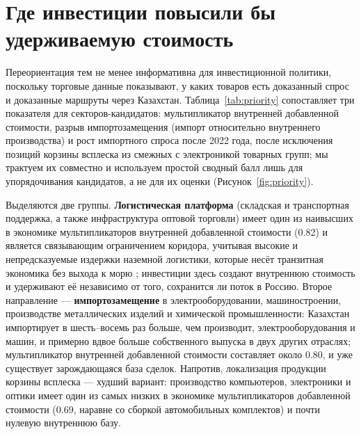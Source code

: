 \documentclass[12pt]{article}
\begin{document}
\section{Где инвестиции повысили бы удерживаемую стоимость}\label{sec:where}

Переориентация тем не менее информативна для инвестиционной политики, поскольку торговые
данные показывают, у каких товаров есть доказанный спрос и доказанные маршруты через
Казахстан. Таблица~\ref{tab:priority} сопоставляет три показателя для секторов-кандидатов:
мультипликатор внутренней добавленной стоимости, разрыв импортозамещения (импорт
относительно внутреннего производства) и рост импортного спроса после 2022 года, после
исключения позиций корзины всплеска из смежных с электроникой товарных групп; мы трактуем
их совместно и используем простой сводный балл лишь для упорядочивания кандидатов, а не для
их оценки (Рисунок~\ref{fig:priority}).

Выделяются две группы. \textbf{Логистическая платформа} (складская и транспортная
поддержка, а также инфраструктура оптовой торговли) имеет один из наивысших в экономике
мультипликаторов внутренней добавленной стоимости (0.82) и является связывающим
ограничением коридора, учитывая высокие и непредсказуемые издержки наземной логистики,
которые несёт транзитная экономика без выхода к морю \citep{arvis2010landlocked}; инвестиции
здесь создают внутреннюю стоимость и удерживают её независимо от того, сохранится ли поток
в Россию. Второе направление — \textbf{импортозамещение} в электрооборудовании,
машиностроении, производстве металлических изделий и химической промышленности: Казахстан
импортирует в шесть--восемь раз больше, чем производит, электрооборудования и машин, и
примерно вдвое больше собственного выпуска в двух других отраслях; мультипликатор внутренней
добавленной стоимости составляет около 0.80, и уже существует зарождающаяся база сделок.
Напротив, локализация продукции корзины всплеска — худший вариант: производство
компьютеров, электроники и оптики имеет один из самых низких в экономике мультипликаторов
добавленной стоимости (0.69, наравне со сборкой автомобильных комплектов) и почти нулевую
внутреннюю базу.
\end{document}
